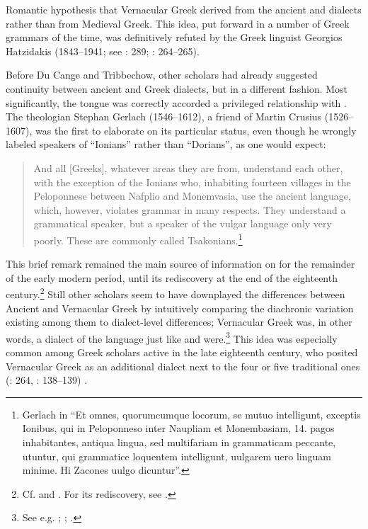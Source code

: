 Romantic hypothesis that Vernacular Greek derived from the ancient  and  dialects rather than from Medieval Greek. This idea, put forward in a number of Greek grammars of the time, was definitively refuted by the Greek linguist Georgios Hatzidakis (1843–1941; see \citealt{Argyropoulos2009}: 289; \citealt{Mackridge2009}: 264–265).

Before Du Cange and Tribbechow, other scholars had already suggested continuity between ancient and  Greek dialects, but in a different fashion. Most significantly, the  tongue was correctly accorded a privileged relationship with . The  theologian Stephan Gerlach (1546–1612), a friend of Martin Crusius (1526–1607), was the first to elaborate on its particular status, even though he wrongly labeled speakers of  “Ionians” rather than “Dorians”, as one would expect:

\begin{quote}
And all [Greeks], whatever areas they are from, understand each other, with the exception of the Ionians who, inhabiting fourteen villages in the Peloponnese between Nafplio and Monemvasia, use the ancient language, which, however, violates grammar in many respects. They understand a grammatical speaker, but a speaker of the vulgar language only very poorly. These are commonly called Tsakonians.\footnote{Gerlach in \citet[489]{Crusius1584} “Et omnes, quorumcumque locorum, se mutuo intelligunt, exceptis Ionibus, qui in Peloponneso inter Naupliam et Monembasiam, 14. pagos inhabitantes, antiqua lingua, sed multifariam in grammaticam peccante, utuntur, qui grammatice loquentem intelligunt, uulgarem uero linguam minime. Hi Zacones uulgo dicuntur”.}
\end{quote}

This brief remark remained the main source of information on  for the remainder of the early modern period, until its rediscovery at the end of the eighteenth century.\footnote{Cf. \citet[44]{Howell1650a} and \citet[vii]{Du1688}. For its rediscovery, see \citet{Famerie2007}.} Still other scholars seem to have downplayed the differences between Ancient and Vernacular Greek by intuitively comparing the diachronic variation existing among them to dialect-level differences; Vernacular Greek was, in other words, a dialect of the language just like  and  were.\footnote{See e.g. \citet[47--48]{Castillo1678}; \citet[\textsc{i.}184, 4th sequence of pagination]{Chambers1728}; \citet[127--128]{Freret1809}.} This idea was especially common among Greek scholars active in the late eighteenth century, who posited Vernacular Greek as an additional dialect next to the four or five traditional ones (\citealt{Mackridge2009}: 264, \citealt{Mackridge2014}: 138--139) .

